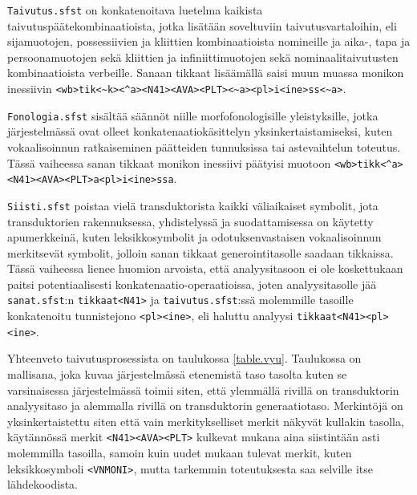 \documentclass[free]{flammie}
\begin{document}
\texttt{Taivutus.sfst} on konkatenoitava luetelma kaikista taivutuspäätekombinaatioista,
jotka lisätään soveltuviin taivutusvartaloihin, eli sijamuotojen, possessiivien
ja kliittien kombinaatioista nomineille ja aika-, tapa ja persoonamuotojen sekä
kliittien ja infiniittimuotojen sekä nominaalitaivutusten kombinaatioista
verbeille. Sanaan tikkaat lisäämällä saisi muun muassa monikon inessiivin
\verb|<wb>tik<~k><^a><N41><AVA><PLT><~a><pl>i<ine>ss<~a>|.

\texttt{Fonologia.sfst} sisältää säännöt niille morfofonologisille yleistyksille, jotka järjestelmässä ovat olleet konkatenaatiokäsittelyn yksinkertaistamiseksi, kuten vokaalisoinnun ratkaiseminen päätteiden tunnuksissa tai astevaihtelun toteutus. Tässä vaiheessa sanan tikkaat monikon inessiivi päätyisi muotoon
\verb|<wb>tikk<^a><N41><AVA><PLT>a<pl>i<ine>ssa|.

\texttt{Siisti.sfst} poistaa vielä transduktorista kaikki väliaikaiset symbolit, jota
transduktorien rakennuksessa, yhdistelyssä ja suodattamisessa on käytetty apumerkkeinä, kuten leksikkosymbolit ja odotuksenvastaisen vokaalisoinnun merkitsevät symbolit, jolloin sanan tikkaat generointitasolle saadaan tikkaissa.
Tässä vaiheessa lienee huomion arvoista, että analyysitasoon ei ole koskettukaan
paitsi potentiaalisesti konkatenaatio-operaatioissa, joten analyysitasolle jää
\texttt{sanat.sfst}:n \texttt{tikkaat<N41>} ja \texttt{taivutus.sfst}:ssä
molemmille tasoille konkatenoitu tunnistejono \texttt{<pl><ine>}, eli haluttu analyysi
\texttt{tikkaat<N41><pl><ine>}.

Yhteenveto taivutusprosessista on taulukossa \ref{table.vyu}. Taulukossa on mallisana, joka
kuvaa järjestelmässä etenemistä taso tasolta kuten se varsinaisessa järjestelmässä toimii siten, että ylemmällä rivillä on transduktorin analyysitaso ja alemmalla rivillä on transduktorin generaatiotaso. Merkintöjä on yksinkertaistettu siten
että vain merkitykselliset merkit näkyvät kullakin tasolla, käytännössä merkit
\texttt{<N41><AVA><PLT>} kulkevat mukana aina siistintään asti molemmilla
tasoilla, samoin kuin uudet mukaan tulevat merkit, kuten leksikkosymboli
\texttt{<VNMONI>},
mutta tarkemmin toteutuksesta saa selville itse lähdekoodista.
\end{document}
